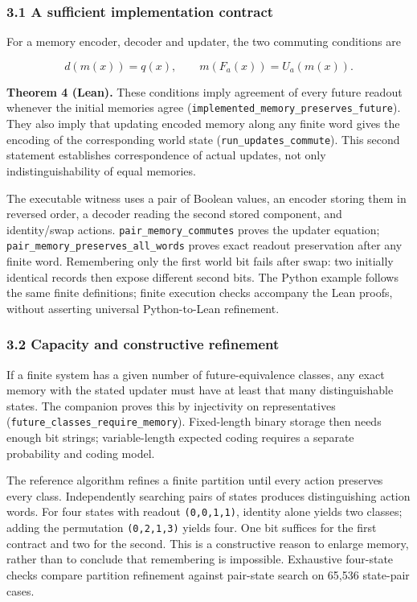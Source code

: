 \documentclass[
  10pt,
]{article}
\begin{document}
\subsubsection{3.1 A sufficient implementation contract}\label{a-sufficient-implementation-contract}

For a memory encoder, decoder and updater, the two commuting conditions are

\protect\hypertarget{math-E0006-0006}{}{\[
d(m(x))=q(x),\qquad m(F_a(x))=U_a(m(x)).
\]}

\textbf{Theorem 4 (Lean).} These conditions imply agreement of every future readout whenever the initial memories agree (\texttt{implemented\_memory\_preserves\_future}). They also imply that updating encoded memory along any finite word gives the encoding of the corresponding world state (\texttt{run\_updates\_commute}). This second statement establishes correspondence of actual updates, not only indistinguishability of equal memories.

The executable witness uses a pair of Boolean values, an encoder storing them in reversed order, a decoder reading the second stored component, and identity/swap actions. \texttt{pair\_memory\_commutes} proves the updater equation; \texttt{pair\_memory\_preserves\_all\_words} proves exact readout preservation after any finite word. Remembering only the first world bit fails after swap: two initially identical records then expose different second bits. The Python example follows the same finite definitions; finite execution checks accompany the Lean proofs, without asserting universal Python-to-Lean refinement.

\subsubsection{3.2 Capacity and constructive refinement}\label{capacity-and-constructive-refinement}

If a finite system has a given number of future-equivalence classes, any exact memory with the stated updater must have at least that many distinguishable states. The companion proves this by injectivity on representatives (\texttt{future\_classes\_require\_memory}). Fixed-length binary storage then needs enough bit strings; variable-length expected coding requires a separate probability and coding model.

The reference algorithm refines a finite partition until every action preserves every class. Independently searching pairs of states produces distinguishing action words. For four states with readout \texttt{(0,0,1,1)}, identity alone yields two classes; adding the permutation \texttt{(0,2,1,3)} yields four. One bit suffices for the first contract and two for the second. This is a constructive reason to enlarge memory, rather than to conclude that remembering is impossible. Exhaustive four-state checks compare partition refinement against pair-state search on 65,536 state-pair cases.
\end{document}

